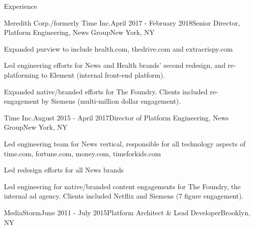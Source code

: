 \documentclass{resume} %
\begin{document}

\begin{rSection}{Experience}

\begin{rSubsection}{Meredith Corp./formerly Time Inc.}{April 2017 - February 2018}{Senior Director, Platform Engineering, News Group}{New York, NY}
\item Expanded purview to include health.com, thedrive.com and extracrispy.com
\item Led engineering efforts for News and Health brands' second redesign, and re-platforming to Element (internal front-end platform).
\item Expanded native/branded efforts for The Foundry. Clients included re-engagement by Siemens (multi-million dollar engagement).
\end{rSubsection}


\begin{rSubsection}{Time Inc.}{August 2015 - April 2017}{Director of Platform Engineering, News Group}{New York, NY}
\item Led engineering team for News vertical, responsible for all technology aspects of time.com, fortune.com, money.com, timeforkids.com
\item Led redesign efforts for all News brands
\item Led engineering for native/branded content engagements for The Foundry, the internal ad agency. Clients included Netflix and Siemens (7 figure engagement).
\end{rSubsection}


\begin{rSubsection}{MediaStorm}{June 2011 - July 2015}{Platform Architect \& Lead Developer}{Brooklyn, NY}


\end{rSubsection}
\end{rSection}
\end{document}
